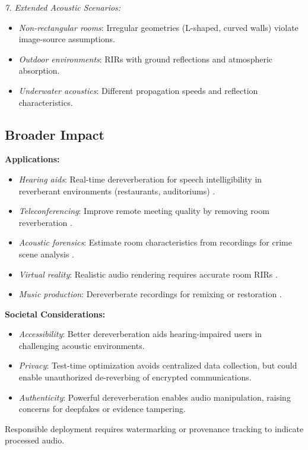\documentclass[12pt,a4paper]{article}
\begin{document}
\textit{7. Extended Acoustic Scenarios:}
\begin{itemize}
\item \textit{Non-rectangular rooms}: Irregular geometries (L-shaped, curved walls) violate image-source assumptions.
\item \textit{Outdoor environments}: RIRs with ground reflections and atmospheric absorption.
\item \textit{Underwater acoustics}: Different propagation speeds and reflection characteristics.
\end{itemize}

\subsection{Broader Impact}

\textbf{Applications:}
\begin{itemize}
\item \textit{Hearing aids}: Real-time dereverberation for speech intelligibility in reverberant environments (restaurants, auditoriums) \cite{naylor2010speech}.
\item \textit{Teleconferencing}: Improve remote meeting quality by removing room reverberation \cite{gannot2017consolidated}.
\item \textit{Acoustic forensics}: Estimate room characteristics from recordings for crime scene analysis \cite{eaton2016estimation}.
\item \textit{Virtual reality}: Realistic audio rendering requires accurate room RIRs \cite{mccormack2019applications}.
\item \textit{Music production}: Dereverberate recordings for remixing or restoration \cite{naylor2010speech}.
\end{itemize}

\textbf{Societal Considerations:}
\begin{itemize}
\item \textit{Accessibility}: Better dereverberation aids hearing-impaired users in challenging acoustic environments.
\item \textit{Privacy}: Test-time optimization avoids centralized data collection, but could enable unauthorized de-reverbing of encrypted communications.
\item \textit{Authenticity}: Powerful dereverberation enables audio manipulation, raising concerns for deepfakes or evidence tampering.
\end{itemize}

Responsible deployment requires watermarking or provenance tracking to indicate processed audio.
\end{document}
